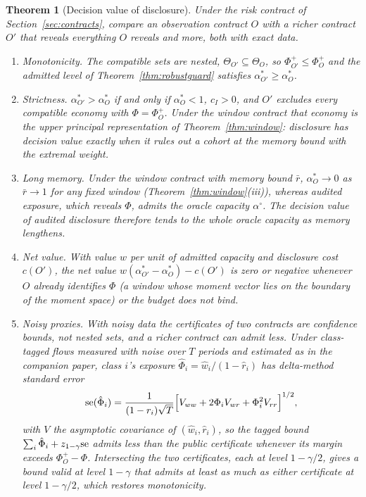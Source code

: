 \documentclass[12pt]{article}
\newtheorem{theorem}{Theorem}[section]
\theoremstyle{definition}
\theoremstyle{remark}
\begin{document}
\begin{theorem}[Decision value of disclosure]\label{thm:disclosure}
Under the risk contract of Section~\ref{sec:contracts}, compare an observation contract $O$ with a richer contract $O'$ that reveals everything $O$ reveals and more, both with exact data.
\begin{enumerate}[label=(\roman*)]
\item \emph{Monotonicity.} The compatible sets are nested, $\Theta_{O'}\subseteq\Theta_O$, so $\Phi^+_{O'}\le\Phi^+_O$ and the admitted level of Theorem~\ref{thm:robustguard} satisfies $\alpha^*_{O'}\ge\alpha^*_O$.
\item \emph{Strictness.} $\alpha^*_{O'}>\alpha^*_O$ if and only if $\alpha^*_O<1$, $c_I>0$, and $O'$ excludes every compatible economy with $\Phi=\Phi^+_O$. Under the window contract that economy is the upper principal representation of Theorem~\ref{thm:window}: disclosure has decision value exactly when it rules out a cohort at the memory bound with the extremal weight.
\item \emph{Long memory.} Under the window contract with memory bound $\bar r$, $\alpha^*_O\to0$ as $\bar r\to1$ for any fixed window (Theorem~\ref{thm:window}(iii)), whereas audited exposure, which reveals $\Phi$, admits the oracle capacity $\alpha^\circ$. The decision value of audited disclosure therefore tends to the whole oracle capacity as memory lengthens.
\item \emph{Net value.} With value $w$ per unit of admitted capacity and disclosure cost $c(O')$, the net value $w(\alpha^*_{O'}-\alpha^*_O)-c(O')$ is zero or negative whenever $O$ already identifies $\Phi$ (a window whose moment vector lies on the boundary of the moment space) or the budget does not bind.
\item \emph{Noisy proxies.} With noisy data the certificates of two contracts are confidence bounds, not nested sets, and a richer contract can admit less. Under class-tagged flows measured with noise over $T$ periods and estimated as in the companion paper, class $i$'s exposure $\hat\Phi_i=\hat w_i/(1-\hat r_i)$ has delta-method standard error
\[
{\rm se}(\hat\Phi_i)=\frac{1}{(1-r_i)\sqrt T}\Bigl[V_{ww}+2\Phi_iV_{wr}+\Phi_i^2V_{rr}\Bigr]^{1/2},
\]
with $V$ the asymptotic covariance of $(\hat w_i,\hat r_i)$, so the tagged bound $\sum_i\hat\Phi_i+z_{1-\gamma}{\rm se}$ admits less than the public certificate whenever its margin exceeds $\Phi^+_O-\Phi$. Intersecting the two certificates, each at level $1-\gamma/2$, gives a bound valid at level $1-\gamma$ that admits at least as much as either certificate at level $1-\gamma/2$, which restores monotonicity.
\end{enumerate}
\end{theorem}
\end{document}
